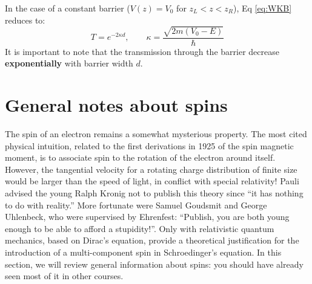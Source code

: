 \documentclass[a4paper,11pt]{article}
\begin{document}
In the case of a constant barrier ($V(z) = V_0$ for $z_L < z< z_R$), Eq \ref{eq:WKB} reduces to:
\begin{equation}
    T = e^{-2 \kappa d}, \qquad \kappa = \frac{\sqrt{2m(V_0-E)}}{\hbar}
\end{equation}
It is important to note that the transmission through the barrier decrease {\bf exponentially} with barrier width $d$.


\section{General notes about spins}
The spin of an electron remains a somewhat mysterious property. The most cited physical intuition, related to the first derivations in 1925 of the spin magnetic moment, is to associate spin to the rotation of the electron around itself. However, the tangential velocity for a rotating charge distribution of finite size would be larger than the speed of light, in conflict with special relativity! Pauli advised the young Ralph Kronig not to publish this theory since “it has nothing to do with reality.” More fortunate were Samuel Goudsmit and George Uhlenbeck, who were supervised by Ehrenfest: “Publish, you are both young enough to be able to afford a
stupidity!”. Only with relativistic quantum mechanics, based on Dirac’s equation, provide a theoretical justification for the introduction of a multi-component spin in Schroedinger's equation.
\newline In this section, we will review general information about spins: you should have already seen most of it in other courses.
\end{document}

